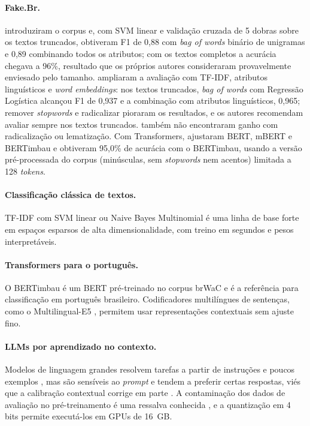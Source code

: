 \paragraph{Fake.Br.} \citet{monteiro2018} introduziram o corpus e, com SVM linear e validação cruzada de 5 dobras sobre os textos truncados, obtiveram F1 de 0,88 com \emph{bag of words} binário de unigramas e 0,89 combinando todos os atributos; com os textos completos a acurácia chegava a 96\%, resultado que os próprios autores consideraram provavelmente enviesado pelo tamanho. \citet{silva2020} ampliaram a avaliação com TF-IDF, atributos linguísticos e \emph{word embeddings}: nos textos truncados, \emph{bag of words} com Regressão Logística alcançou F1 de 0,937 e a combinação com atributos linguísticos, 0,965; remover \emph{stopwords} e radicalizar pioraram os resultados, e os autores recomendam avaliar sempre nos textos truncados. \citet{calaigian2023} também não encontraram ganho com radicalização ou lematização. Com Transformers, \citet{pires2024} ajustaram BERT, mBERT e BERTimbau e obtiveram 95,0\% de acurácia com o BERTimbau, usando a versão pré-processada do corpus (minúsculas, sem \emph{stopwords} nem acentos) limitada a 128 \emph{tokens}.

\paragraph{Classificação clássica de textos.} TF-IDF \citep{salton1988} com SVM linear \citep{joachims1998} ou Naive Bayes Multinomial \citep{mccallum1998} é uma linha de base forte em espaços esparsos de alta dimensionalidade, com treino em segundos e pesos interpretáveis.

\paragraph{Transformers para o português.} O BERTimbau \citep{souza2020} é um BERT \citep{devlin2019} pré-treinado no corpus brWaC e é a referência para classificação em português brasileiro. Codificadores multilíngues de sentenças, como o Multilingual-E5 \citep{wang2024e5}, permitem usar representações contextuais sem ajuste fino.

\paragraph{LLMs por aprendizado no contexto.} Modelos de linguagem grandes resolvem tarefas a partir de instruções e poucos exemplos \citep{brown2020}, mas são sensíveis ao \emph{prompt} e tendem a preferir certas respostas, viés que a calibração contextual corrige em parte \citep{zhao2021}. A contaminação dos dados de avaliação no pré-treinamento é uma ressalva conhecida \citep{sainz2023}, e a quantização em 4 bits \citep{dettmers2023} permite executá-los em GPUs de 16~GB.

